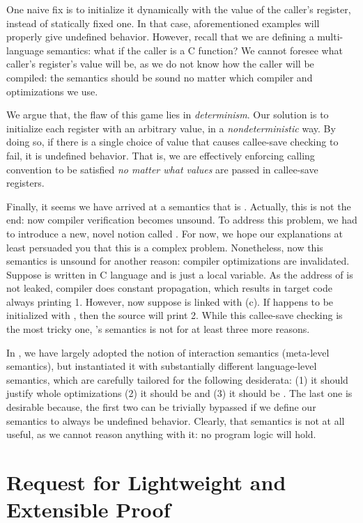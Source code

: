 {One naive fix is to initialize it dynamically with the value of the caller's register, instead of statically fixed one.
In that case, aforementioned examples will properly give undefined behavior.
However, recall that we are defining a multi-language semantics: what if the caller is a C function?
We cannot foresee what caller's register's value will be, as we do not know how the caller will be compiled: the semantics should be sound no matter which compiler and optimizations we use.


We argue that, the flaw of this game lies in \textit{determinism}.
Our solution is to initialize each register with an arbitrary value, in a \textit{nondeterministic} way.
By doing so, if there is a single choice of value that causes callee-save checking to fail, it is undefined behavior.
That is, we are effectively enforcing calling convention to be satisfied \textit{no matter what values} are passed in callee-save registers.


Finally, it seems we have arrived at a semantics that is \lbound{}.
Actually, this is not the end: now compiler verification becomes unsound.
To address this problem, we had to introduce a new, novel notion called \iptr{}.
For now, we hope our explanations at least persuaded you that this is a complex problem.
Nonetheless, now this semantics is unsound for another reason: compiler optimizations are invalidated.
Suppose  is written in C language and  is just a local variable.
As the address of  is not leaked, compiler does constant propagation, which results in target code always printing 1.
However, now suppose  is linked with (c).
If  happens to be initialized with , then the source will print 2.
While this callee-save checking is the most tricky one, \ccc{}'s semantics is not \lbound{} for at least three more reasons.


In \ccm{}, we have largely adopted the notion of interaction semantics (meta-level semantics), but instantiated it with substantially different language-level semantics, which are carefully tailored for the following desiderata:
(1) it should justify whole \cc{} optimizations (2) it should be \lbound{} and (3) it should be \ubound{}.
The last one is desirable because, the first two can be trivially bypassed if we define our semantics to always be undefined behavior.
Clearly, that semantics is not at all useful, as we cannot reason anything with it: \eg{} no program logic will hold.


\section{Request for Lightweight and Extensible Proof}\label{sec:introduction:proof}


}

